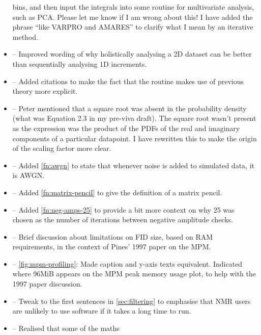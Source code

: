 \documentclass[12pt]{article}
\begin{document}
\begin{itemize}
            bins, and then input the integrals into some routine for multivariate
            analysis, such as PCA. Please let me know if I am wrong about this!
            I have added the phrase ``like VARPRO and
            AMARES'' to clarify what I mean by an iterative method.
        \item {} -- Improved wording of why holistically
            analysing a 2D dataset can be better than sequentially analysing 1D
            increments.
        \item {} -- Added citations to make the fact
            that the routine makes use of previous theory more explicit.
        \item {} -- Peter mentioned that a square
            root was absent in the probability density (what was Equation 2.3
            in my pre-viva draft). The square root wasn't present as the
            expression was the product of the PDFs of the real and imaginary
            components of a particular datapoint. I have rewritten this to make
            the origin of the scaling factor more clear.
        \item {} -- Added \cref{fn:awgn} to state that whenever
            noise is added to simulated data, it is AWGN.
        \item {} -- Added \cref{fn:matrix-pencil} to
            give the definition of a matrix pencil.
        \item {} -- Added \cref{fn:neg-amps-25} to
            provide a bit more context on why 25 was chosen as the number of
            iterations between negative amplitude checks.
        \item {} -- Brief discussion about limitations
            on FID size, based on RAM requirements, in the context of Pines'
            1997 paper on the MPM.
        \item {} -- \cref{fig:mpm-profiling}: Made
            caption and y-axis texts equivalent. Indicated where 96MiB
            appears on the MPM peak memory usage plot, to help with the 1997
            paper discussion.
        \item {} -- Tweak to the first sentences in
            \cref{sec:filtering} to emphasise that NMR users are unlikely to
            use software if it takes a long time to run.
        \item {} -- Realised that some of the maths

\end{itemize}
\end{document}
